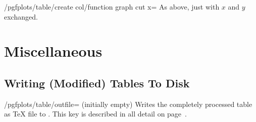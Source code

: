 \documentclass[a4paper]{ltxdoc}
\begin{document}
\begin{stylekey}{/pgfplots/table/create col/function graph cut x=}
    As above, just with $x$ and $y$ exchanged.
\end{stylekey}


\section{Miscellaneous}

\subsection{Writing (Modified) Tables To Disk}

\begin{key}{/pgfplots/table/outfile= (initially empty)}
    Writes the completely processed table as \TeX{} file to .
    This key is described in all detail on page~\pageref{page:outfile}.
\end{key}
\end{document}
